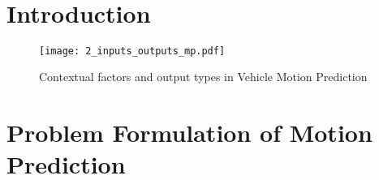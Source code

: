 

\

\section{Introduction}
\label{sec:2_introduction}

\begin{figure}[h]
	\centering
	\texttt{[image: 2\_inputs\_outputs\_mp.pdf]}
	\caption{Contextual factors and output types in Vehicle Motion Prediction}
	\label{fig:2_input_output_map}
\end{figure}



\section{Problem Formulation of Motion Prediction}
\label{sec:2_problem_formulation_mp}

